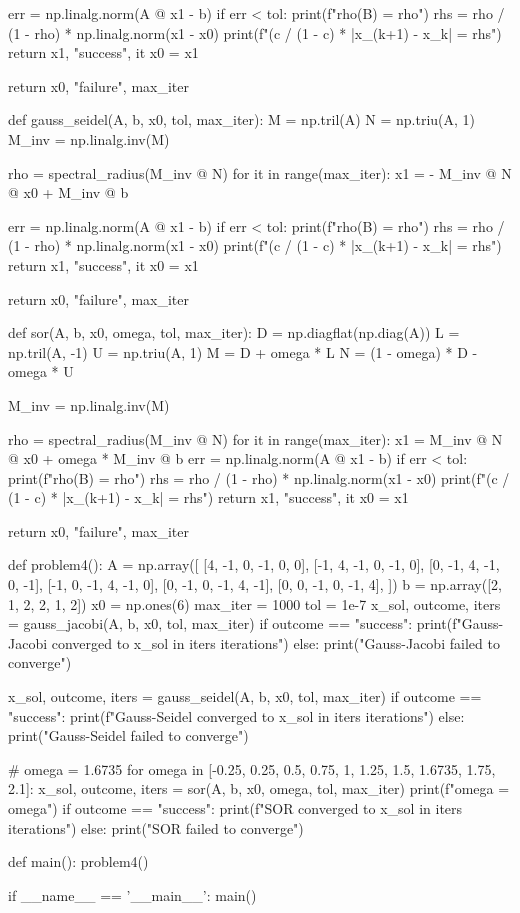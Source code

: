 \documentclass{homework}
\begin{document}
\begin{python}
        err = np.linalg.norm(A @ x1 - b)
        if err < tol:
            print(f"rho(B) = {rho}")
            rhs = rho / (1 - rho) * np.linalg.norm(x1 - x0)
            print(f"(c / (1 - c) * |x_(k+1) - x_k| = {rhs}")
            return x1, "success", it
        x0 = x1

    return x0, "failure", max_iter

def gauss_seidel(A, b, x0, tol, max_iter):
    M = np.tril(A)
    N = np.triu(A, 1)
    M_inv = np.linalg.inv(M)

    rho = spectral_radius(M_inv @ N)
    for it in range(max_iter):
        x1 = - M_inv @ N @ x0 + M_inv @ b

        err = np.linalg.norm(A @ x1 - b)
        if err < tol:
            print(f"rho(B) = {rho}")
            rhs = rho / (1 - rho) * np.linalg.norm(x1 - x0)
            print(f"(c / (1 - c) * |x_(k+1) - x_k| = {rhs}")
            return x1, "success", it
        x0 = x1

    return x0, "failure", max_iter

def sor(A, b, x0, omega, tol, max_iter):
    D = np.diagflat(np.diag(A))
    L = np.tril(A, -1)
    U = np.triu(A, 1)
    M = D + omega * L
    N = (1 - omega) * D - omega * U

    M_inv = np.linalg.inv(M)

    rho = spectral_radius(M_inv @ N)
    for it in range(max_iter):
        x1 = M_inv @ N @ x0 + omega * M_inv @ b
        err = np.linalg.norm(A @ x1 - b)
        if err < tol:
            print(f"rho(B) = {rho}")
            rhs = rho / (1 - rho) * np.linalg.norm(x1 - x0)
            print(f"(c / (1 - c) * |x_(k+1) - x_k| = {rhs}")
            return x1, "success", it
        x0 = x1

    return x0, "failure", max_iter



def problem4():
    A =  np.array([
        [4, -1, 0, -1, 0, 0],
        [-1, 4, -1, 0, -1, 0],
        [0, -1, 4, -1, 0, -1],
        [-1, 0, -1, 4, -1, 0],
        [0, -1, 0, -1, 4, -1],
        [0, 0, -1, 0, -1, 4],
    ])
    b = np.array([2, 1, 2, 2, 1, 2])
    x0 = np.ones(6)
    max_iter = 1000
    tol = 1e-7
    x_sol, outcome, iters = gauss_jacobi(A, b, x0, tol, max_iter)
    if outcome == "success":
        print(f"Gauss-Jacobi converged to {x_sol} in {iters} iterations")
    else:
        print("Gauss-Jacobi failed to converge")

    x_sol, outcome, iters = gauss_seidel(A, b, x0, tol, max_iter)
    if outcome == "success":
        print(f"Gauss-Seidel converged to {x_sol} in {iters} iterations")
    else:
        print("Gauss-Seidel failed to converge")

    # omega = 1.6735
    for omega in [-0.25, 0.25, 0.5, 0.75, 1, 1.25, 1.5, 1.6735, 1.75, 2.1]:
        x_sol, outcome, iters = sor(A, b, x0, omega, tol, max_iter)
        print(f"omega = {omega}")
        if outcome == "success":
            print(f"SOR converged to {x_sol} in {iters} iterations")
        else:
            print("SOR failed to converge")


def main():
    problem4()


if __name__ == '__main__':
    main()


\end{python}
\end{document}
